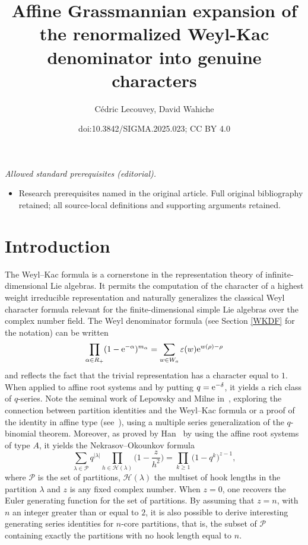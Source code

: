 \documentclass[10pt,a4paper]{amsart}
\title{Affine Grassmannian expansion of the renormalized Weyl-Kac denominator into genuine characters}
\author{Cédric Lecouvey, David Wahiche}
\date{doi:10.3842/SIGMA.2025.023; CC BY 4.0}
\numberwithin{equation}{section}
\begin{document}
\maketitle
\noindent\textit{Allowed standard prerequisites (editorial).}\begin{itemize}
\item Research prerequisites named in the original article. Full original bibliography retained; all source-local definitions and supporting arguments retained.
\end{itemize}\medskip
\section{Introduction}

The Weyl--Kac formula is a cornerstone in the representation theory of
infinite-dimensional Lie algebras. It
permits the computation of the character of a highest weight irreducible
representation and naturally generalizes the classical Weyl character
formula relevant for the finite-dimensional simple Lie algebras over
the complex number field. The Weyl denominator formula (see Section \ref{WKDF} for the notation) can be written%
\begin{equation*}
\prod_{\alpha \in R_{+}}(1-{\rm e}^{-\alpha })^{m_{\alpha }}=\sum_{w\in
	W_{a}}\varepsilon (w){\rm e}^{w(\rho )-\rho }
\end{equation*}%
and reflects the fact that the trivial representation has a character equal
to $1$. When applied to affine root systems and by putting $q={\rm e}^{-\delta}$, it yields a rich class of $q$-series. Note  the seminal work of Lepowsky and Milne in~\cite{MilneLepowsky}, exploring the connection between partition identities and the Weyl--Kac formula or a proof of the identity in affine type  (see~\cite{Milne}), using a multiple series generalization of the $q$-binomial theorem. Moreover, as proved by Han~\cite{Ha} by using the affine
root systems of type $A$, it yields the Nekrasov--Okounkov
formula%
\begin{equation}\label{NOdebut}
\sum_{\lambda \in \mathcal{P}}q^{\vert \lambda \vert }\prod_{h\in
	\mathcal{H}(\lambda )}\biggl( 1-\frac{z}{h^{2}}\biggr) =\prod_{k\geq
	1}\bigl(1-q^{k}\bigr)^{z-1},
\end{equation}%
where $\mathcal{P}$ is the set of partitions, $\mathcal{H}(\lambda )$ the
multiset of hook lengths in the partition $\lambda $ and $z$ is any fixed
complex number. When $z=0$, one recovers the Euler
generating function for the set of partitions. By assuming that $z=n$, with $n
$ an integer greater than or equal to $2$, it is also possible to derive
interesting generating series identities for $n$-core partitions,
that is, the subset of $\mathcal{P}$ containing exactly the partitions with
no hook length equal to $n$.
\end{document}
